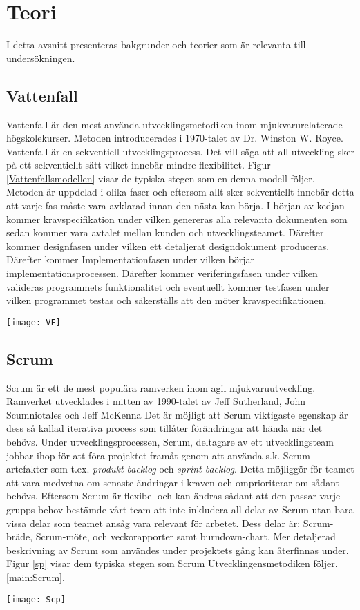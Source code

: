 \section{Teori} \label{sec:Lieth_Wahid-theory}
I detta avsnitt presenteras bakgrunder och teorier som är relevanta till undersökningen. 
\subsection{Vattenfall}
Vattenfall är den mest använda utvecklingsmetodiken inom mjukvarurelaterade högskolekurser. Metoden introducerades i 1970-talet \cite{WaterfalM} av Dr. Winston W. Royce. \cite{managing} Vattenfall är en sekventiell utvecklingsprocess. Det vill säga att all utveckling sker på ett sekventiellt sätt vilket innebär mindre flexibilitet. Figur \ref{Vattenfallsmodellen} visar de typiska 
stegen som en denna modell följer. Metoden är uppdelad i olika faser och eftersom allt sker sekventiellt innebär detta att varje fas måste vara avklarad innan den nästa kan börja.  I början av kedjan kommer kravspecifikation under vilken genereras alla relevanta dokumenten som sedan kommer vara avtalet mellan kunden och utvecklingsteamet. \cite{GameDesign} Därefter kommer designfasen under vilken ett detaljerat designdokument produceras. Därefter kommer Implementationfasen under vilken börjar implementationsprocessen. Därefter kommer veriferingsfasen under vilken valideras programmets funktionalitet och eventuellt kommer testfasen under vilken programmet testas och säkerställs att den möter kravspecifikationen.
\begin{figure*}[h]
	\centering
	\texttt{[image: VF]}
	\caption{Vattenfallsmodellen\cite{theWaterFall}}
	\label{Vattenfallsmodellen}
\end{figure*}
\subsection{Scrum}
Scrum är ett de mest populära ramverken inom agil mjukvaruutveckling. Ramverket utvecklades i mitten av 1990-talet av Jeff Sutherland, John Scumniotales och Jeff McKenna Det är möjligt att Scrum viktigaste egenskap är dess så kallad iterativa process som tillåter förändringar att hända när det behövs. Under utvecklingsprocessen, Scrum, deltagare av ett utvecklingsteam jobbar ihop för att föra projektet framåt genom att använda s.k. Scrum artefakter som t.ex. \textit{produkt-backlog} och \textit{sprint-backlog}. Detta möjliggör för teamet att vara medvetna om senaste ändringar i kraven och omprioriterar om sådant behövs.  \cite{aamir2017incorporating} Eftersom Scrum är flexibel och kan ändras sådant att den passar varje grupps behov bestämde vårt team att inte inkludera all delar av Scrum utan bara vissa delar som teamet ansåg vara relevant för arbetet. Dess delar är:
Scrum-bräde, Scrum-möte, och veckorapporter samt burndown-chart. Mer detaljerad beskrivning av Scrum som användes under projektets gång kan återfinnas under. Figur \ref{sp} visar dem typiska stegen som Scrum Utvecklingensmetodiken följer.
\ref{main:Scrum}.
\begin{figure*}[h]
	\centering
	\texttt{[image: Scp]}
	\caption{Dem typiska stegen som följs i Scrum\cite{Scrumprocess}}
	\label{sp}
\end{figure*}
